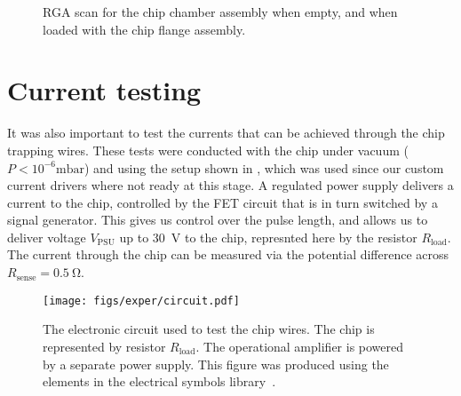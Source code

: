   \begin{figure}[htb]
  \centering
  \caption{RGA scan for the chip chamber assembly when empty, and when loaded
  with the chip flange assembly.}
  \label{exper:fig:rga}
\end{figure}


\section{Current testing}
\label{exper:current}

It was also important to test the currents that can be achieved through the
chip trapping wires. These tests were conducted with the chip under vacuum
($P<10^{-6}\si{\milli\bar}$) and using the setup shown in
, which was used since our custom current drivers
where not ready at this stage. A regulated power supply delivers a current to
the chip, controlled by the FET circuit that is in turn switched by a signal
generator. This gives us control over the pulse length, and allows us to
deliver voltage $V_\text{PSU}$ up to \SI{30}{\volt} to the chip, represnted
here by the resistor $R_\text{load}$. The current through the chip can be
measured via the potential difference across $R_\text{sense} = \SI{0.5}{\ohm}$.

\begin{figure}[htb]
  \centering
  \texttt{[image: figs/exper/circuit.pdf]}
  \caption{The electronic circuit used to test the chip wires. The chip is
  represented by resistor $R_\text{load}$. The operational amplifier is powered
  by a separate power supply. This figure was produced using the elements in
the electrical symbols library~\cite{}.}
  \label{exper:fig:curtest}
\end{figure}

